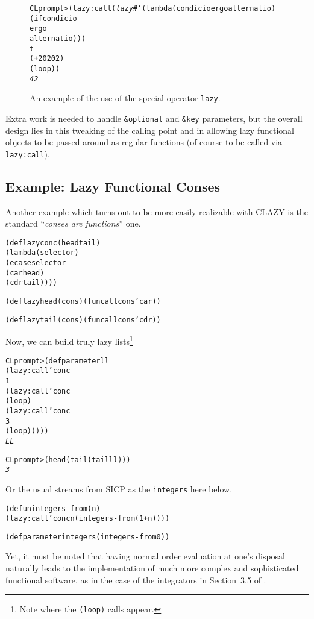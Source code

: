 \documentclass[fleqn,10pt]{article}
\newcommand{\CLAZY}{\textsf{CLAZY}}
\newcommand{\code}[1]{\texttt{#1}}
\begin{document}
\begin{figure}
\hrulefill
\begin{alltt}
   CL prompt> (lazy:call (\emph{lazy} #'(lambda (condicio ergo alternatio)
                                    (if condicio
                                        ergo
                                        alternatio)))
                         t
                         (+ 20 20 2)
                         (loop))
   \textit{42}
\end{alltt}
\hrulefill
\caption{An example of the use of the special operator \code{lazy}.}
\label{fig:lazy-special-op-use}
\end{figure}

Extra work is needed to handle \code{\&optional} and \code{\&key}
parameters, but the overall design lies in this tweaking of the
calling point and in allowing lazy functional objects to be passed
around as regular functions (of course to be called via
\code{lazy:call}).


\subsection{Example: Lazy Functional Conses}

Another example which turns out to be more easily realizable with
\CLAZY{} is the standard ``\emph{conses are functions}'' one.
\begin{alltt}

   (deflazy conc (head tail)
      (lambda (selector)
          (ecase selector
            (car head)
            (cdr tail))))

   (deflazy head (cons) (funcall cons 'car))

   (deflazy tail (cons) (funcall cons 'cdr))

\end{alltt}
Now, we can build truly lazy lists\footnote{Note where the
  \code{(loop)} calls appear.}
\begin{alltt}

   CL prompt> (defparameter ll
                 (lazy:call 'conc
                            1
                            (lazy:call 'conc
                                       (loop)
                                       (lazy:call 'conc
                                                  3
                                                  (loop)))))
   \textit{LL}

   CL prompt> (head (tail (tail ll)))
   \textit{3}

\end{alltt}
Or the usual streams from SICP as the \code{integers} here below.
\begin{alltt}

   (defun integers-from (n)
      (lazy:call 'conc n (integers-from (1+ n))))

   (defparameter integers (integers-from 0))

\end{alltt}
Yet, it must be noted that having normal order evaluation at one's
disposal naturally leads to the implementation of much more complex
and sophisticated functional software, as in the case of the
integrators in Section~3.5 of \cite{SICP}.
\end{document}
